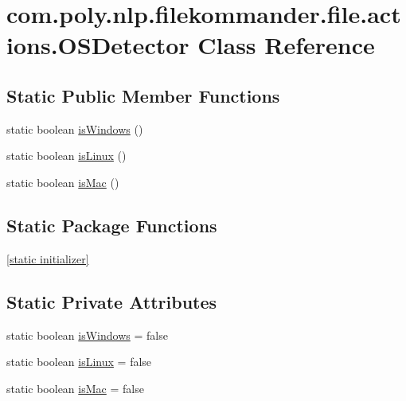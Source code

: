 \hypertarget{classcom_1_1poly_1_1nlp_1_1filekommander_1_1file_1_1actions_1_1_o_s_detector}{\section{com.\-poly.\-nlp.\-filekommander.\-file.\-actions.\-O\-S\-Detector Class Reference}
\label{classcom_1_1poly_1_1nlp_1_1filekommander_1_1file_1_1actions_1_1_o_s_detector}
}
\subsection*{Static Public Member Functions}
\begin{DoxyCompactItemize}
\item 
static boolean \hyperlink{classcom_1_1poly_1_1nlp_1_1filekommander_1_1file_1_1actions_1_1_o_s_detector_ac64c693bb806da889cf3eefc41a4294a}{is\-Windows} ()
\item 
static boolean \hyperlink{classcom_1_1poly_1_1nlp_1_1filekommander_1_1file_1_1actions_1_1_o_s_detector_a25112197d08a5d0db2cb9d24c7c43212}{is\-Linux} ()
\item 
static boolean \hyperlink{classcom_1_1poly_1_1nlp_1_1filekommander_1_1file_1_1actions_1_1_o_s_detector_af341d0aa020032a1e0646c1c589eaed3}{is\-Mac} ()
\end{DoxyCompactItemize}
\subsection*{Static Package Functions}
\begin{DoxyCompactItemize}
\item 
\hyperlink{classcom_1_1poly_1_1nlp_1_1filekommander_1_1file_1_1actions_1_1_o_s_detector_ad1b4bb03ca503507acbe854a9beac23f}{\mbox{[}static initializer\mbox{]}}
\end{DoxyCompactItemize}
\subsection*{Static Private Attributes}
\begin{DoxyCompactItemize}
\item 
static boolean \hyperlink{classcom_1_1poly_1_1nlp_1_1filekommander_1_1file_1_1actions_1_1_o_s_detector_a79c0b2e4cc827207058a2bd69447964e}{is\-Windows} = false
\item 
static boolean \hyperlink{classcom_1_1poly_1_1nlp_1_1filekommander_1_1file_1_1actions_1_1_o_s_detector_a22ec143bd07db6e90565820d45099d16}{is\-Linux} = false
\item 
static boolean \hyperlink{classcom_1_1poly_1_1nlp_1_1filekommander_1_1file_1_1actions_1_1_o_s_detector_a1340febacdcad32dd61d018c21c6bb1f}{is\-Mac} = false
\end{DoxyCompactItemize}


